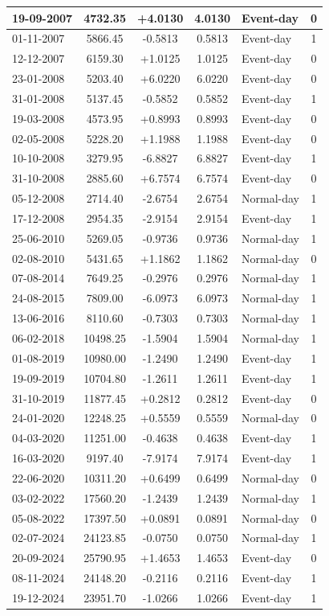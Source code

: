 \documentclass[12pt,a4paper]{article}
\begin{document}
\begin{table}[H]
\begin{tabular}{|l|c|c|c|l|c|}
19-09-2007 & 4732.35 & +4.0130 & 4.0130 & Event-day & 0 \\ \hline
01-11-2007 & 5866.45 & -0.5813 & 0.5813 & Event-day & 1 \\ \hline
12-12-2007 & 6159.30 & +1.0125 & 1.0125 & Event-day & 0 \\ \hline
23-01-2008 & 5203.40 & +6.0220 & 6.0220 & Event-day & 0 \\ \hline
31-01-2008 & 5137.45 & -0.5852 & 0.5852 & Event-day & 1 \\ \hline
19-03-2008 & 4573.95 & +0.8993 & 0.8993 & Event-day & 0 \\ \hline
02-05-2008 & 5228.20 & +1.1988 & 1.1988 & Event-day & 0 \\ \hline
10-10-2008 & 3279.95 & -6.8827 & 6.8827 & Event-day & 1 \\ \hline
31-10-2008 & 2885.60 & +6.7574 & 6.7574 & Event-day & 0 \\ \hline
05-12-2008 & 2714.40 & -2.6754 & 2.6754 & Normal-day & 1 \\ \hline
17-12-2008 & 2954.35 & -2.9154 & 2.9154 & Event-day & 1 \\ \hline
25-06-2010 & 5269.05 & -0.9736 & 0.9736 & Normal-day & 1 \\ \hline
02-08-2010 & 5431.65 & +1.1862 & 1.1862 & Normal-day & 0 \\ \hline
07-08-2014 & 7649.25 & -0.2976 & 0.2976 & Normal-day & 1 \\ \hline
24-08-2015 & 7809.00 & -6.0973 & 6.0973 & Normal-day & 1 \\ \hline
13-06-2016 & 8110.60 & -0.7303 & 0.7303 & Normal-day & 1 \\ \hline
06-02-2018 & 10498.25 & -1.5904 & 1.5904 & Normal-day & 1 \\ \hline
01-08-2019 & 10980.00 & -1.2490 & 1.2490 & Event-day & 1 \\ \hline
19-09-2019 & 10704.80 & -1.2611 & 1.2611 & Event-day & 1 \\ \hline
31-10-2019 & 11877.45 & +0.2812 & 0.2812 & Event-day & 0 \\ \hline
24-01-2020 & 12248.25 & +0.5559 & 0.5559 & Normal-day & 0 \\ \hline
04-03-2020 & 11251.00 & -0.4638 & 0.4638 & Event-day & 1 \\ \hline
16-03-2020 & 9197.40 & -7.9174 & 7.9174 & Event-day & 1 \\ \hline
22-06-2020 & 10311.20 & +0.6499 & 0.6499 & Normal-day & 0 \\ \hline
03-02-2022 & 17560.20 & -1.2439 & 1.2439 & Normal-day & 1 \\ \hline
05-08-2022 & 17397.50 & +0.0891 & 0.0891 & Normal-day & 0 \\ \hline
02-07-2024 & 24123.85 & -0.0750 & 0.0750 & Normal-day & 1 \\ \hline
20-09-2024 & 25790.95 & +1.4653 & 1.4653 & Event-day & 0 \\ \hline
08-11-2024 & 24148.20 & -0.2116 & 0.2116 & Event-day & 1 \\ \hline
19-12-2024 & 23951.70 & -1.0266 & 1.0266 & Event-day & 1 \\ \hline
\end{tabular}
\end{table}
\end{document}
